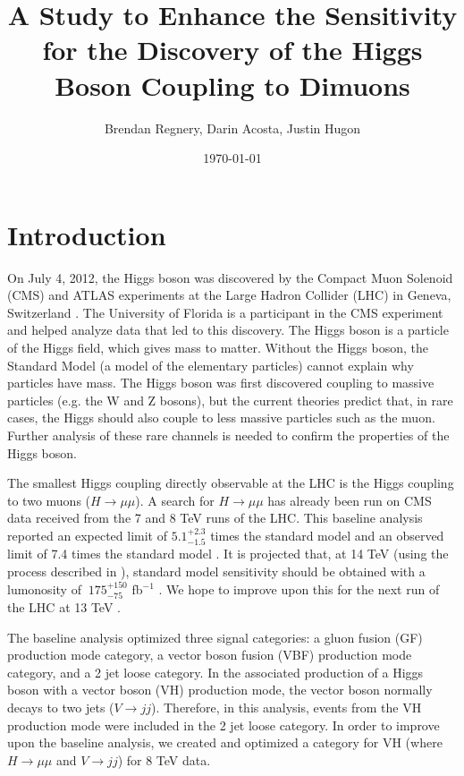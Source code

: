 \documentclass[12pt]{article}
\title{A Study to Enhance the Sensitivity for the Discovery of the Higgs Boson Coupling to Dimuons}
\author{Brendan Regnery, Darin Acosta, Justin Hugon}
\date{\today}
\begin{document}
\maketitle
 
\section{Introduction}

On July 4, 2012, the Higgs boson was discovered by the Compact Muon Solenoid (CMS) and ATLAS experiments 
at the Large Hadron Collider (LHC) in Geneva, Switzerland \cite{HiggsDisc}. The University of Florida is
a participant in the CMS experiment and helped analyze data that led to this discovery.
The Higgs boson is a particle of the Higgs field, which gives mass to matter. Without the Higgs boson, 
the Standard Model (a model of the elementary particles) cannot explain why particles have mass. 
The Higgs boson was first discovered coupling to massive particles (e.g. the W and Z bosons), 
but the current theories predict that, in rare cases, the Higgs should also couple to less massive particles such as the muon. 
Further analysis of these rare channels is needed to confirm the properties of the Higgs boson. 

The smallest Higgs coupling directly observable at the LHC is the Higgs coupling to two muons ($H\rightarrow \mu \mu$). 
A search for $H\rightarrow \mu \mu$ has already been run on CMS data received from the 7 and 8 TeV runs of the LHC. 
This baseline analysis reported an expected limit of $5.1^{+2.3}_{-1.5}$ times the standard model
and an observed limit of 7.4 times the standard model \cite{hmumuPap}. It is projected that, 
at 14 TeV (using the process described in \cite{snow}), standard model 
sensitivity should be obtained with a lumonosity of $~175^{+150}_{-75}$ fb$^{-1}$ \cite{hmumuPap}. 
We hope to improve upon this for the next run of the LHC at 13 TeV \cite{AN2012_459}. 

The baseline analysis optimized three signal categories: a gluon fusion (GF) production mode category, 
a vector boson fusion (VBF) production mode category, and a 2 jet loose category. 
In the associated production of a Higgs boson with a vector boson (VH) production mode, 
the vector boson normally decays to two jets ($V\rightarrow jj$). Therefore, in this analysis, events from the VH production mode
were included in the 2 jet loose category. In order to improve upon the baseline analysis, we created and optimized 
a category for VH (where $H\rightarrow \mu \mu$ and $V\rightarrow jj$) for 8 TeV data.
\end{document}
